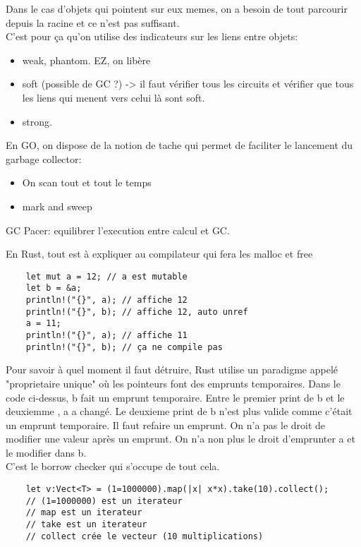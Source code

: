 \documentclass[11pt]{article}
\begin{document}
Dans le cas d'objets qui pointent sur eux memes, on a besoin de tout parcourir depuis la racine et ce n'est pas suffisant.\\
C'est pour ça qu'on utilise des indicateurs sur les liens entre objets:
\begin{itemize}
    \item weak, phantom. EZ, on libère
    \item soft (possible de GC ?) -> il faut vérifier tous les circuits et vérifier que tous les liens qui menent vers celui là sont soft.
    \item strong. 
\end{itemize}


En GO, on dispose de la notion de tache qui permet de faciliter le lancement du garbage collector:
\begin{itemize}
    \item On scan tout et tout le temps
    \item mark and sweep
\end{itemize}


GC Pacer: equilibrer l'execution entre calcul et GC.

\pagebreak

En Rust, tout est à expliquer au compilateur qui fera les malloc et free
\begin{verbatim}
    let mut a = 12; // a est mutable
    let b = &a;
    println!("{}", a); // affiche 12
    println!("{}", b); // affiche 12, auto unref    
    a = 11;
    println!("{}", a); // affiche 11
    println!("{}", b); // ça ne compile pas
\end{verbatim}
Pour savoir à quel moment il faut détruire, Rust utilise un paradigme appelé "proprietaire unique" où les pointeurs font des emprunts temporaires. Dans le code ci-dessus, b fait un emprunt temporaire. Entre le premier print de b et le deuxiemme , a a changé. Le deuxieme print de b n'est plus valide comme c'était un emprunt temporaire. Il faut refaire un emprunt. On n'a pas le droit de modifier une valeur après un emprunt. On n'a non plus le droit d'emprunter a et le modifier dans b.\\
C'est le borrow checker qui s'occupe de tout cela.

\begin{verbatim}
    let v:Vect<T> = (1=1000000).map(|x| x*x).take(10).collect();
    // (1=1000000) est un iterateur
    // map est un iterateur
    // take est un iterateur
    // collect crée le vecteur (10 multiplications)
\end{verbatim}
\end{document}

